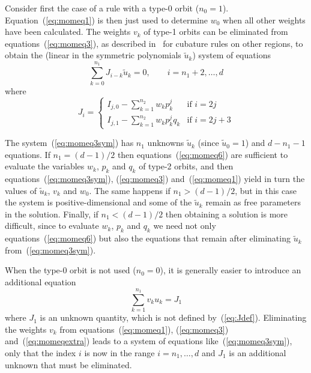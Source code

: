 \documentclass{article}
\begin{document}
Consider first the case of a rule with a type-0 orbit ($n_0=1$). Equation~(\ref{eq:momeq1}) is then just used to determine $w_0$ when all other weights have been calculated. The weights $v_k$ of type-1 orbits can be eliminated from equations~(\ref{eq:momeq3}), as described in~\citep[pp.~771--773]{RabinowitzRichter1969} for cubature rules on other regions, to obtain the (linear in the symmetric polynomials $\tilde{u}_k$) system of equations
\begin{equation}
  \label{eq:momeq3sym}
  \sum_{k=0}^{n_1} J_{i-k} \tilde{u}_k = 0, \qquad i=n_1+2, \ldots, d
\end{equation}
where
\begin{equation}
  \label{eq:Jdef}
  J_i = \begin{cases}
    \displaystyle{ I_{j,0} - \sum_{k=1}^{n_2} w_k p_k^j     } & \text{if $i=2j$}   \\[2em]
    \displaystyle{ I_{j,1} - \sum_{k=1}^{n_2} w_k p_k^j q_k } & \text{if $i=2j+3$}
  \end{cases}
\end{equation}

The system~(\ref{eq:momeq3sym}) has $n_1$ unknowns $\tilde{u}_k$ (since $\tilde{u}_0 = 1$) and $d-n_1-1$ equations. If $n_1=(d-1)/2$ then equations~(\ref{eq:momeq6}) are sufficient to evaluate the variables $w_k$, $p_k$ and $q_k$ of type-2 orbits, and then equations~(\ref{eq:momeq3sym}), (\ref{eq:momeq3}) and~(\ref{eq:momeq1}) yield in turn the values of $\tilde{u}_k$, $v_k$ and $w_0$. The same happens if $n_1>(d-1)/2$, but in this case the system is positive-dimensional and some of the $\tilde{u}_k$ remain as free parameters in the solution. Finally, if $n_1<(d-1)/2$ then obtaining a solution is more difficult, since to evaluate $w_k$, $p_k$ and $q_k$ we need not only equations~(\ref{eq:momeq6}) but also the equations that remain after eliminating $\tilde{u}_k$ from~(\ref{eq:momeq3sym}).

When the type-0 orbit is not used ($n_0=0$), it is generally easier to introduce an additional equation
\begin{equation}
  \label{eq:momeqextra}
  \sum_{k=1}^{n_1} v_k u_k = J_1
\end{equation}
where $J_1$ is an unknown quantity, which is not defined by~(\ref{eq:Jdef}). Eliminating the weights $v_k$ from equations~(\ref{eq:momeq1}), (\ref{eq:momeq3}) and~(\ref{eq:momeqextra}) leads to a system of equations like~(\ref{eq:momeq3sym}), only that the index $i$ is now in the range $i=n_1, \ldots, d$ and $J_1$ is an additional unknown that must be eliminated.
\end{document}

